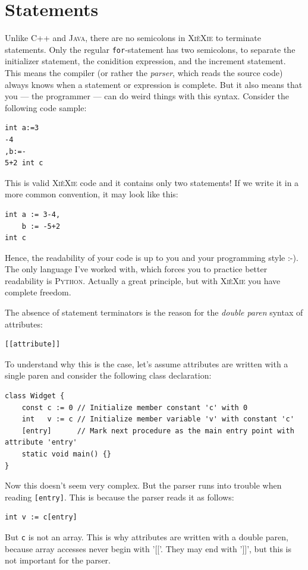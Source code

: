 \documentclass{report}
\def\xiexie{\textsc{Xi\`eXie}\xspace}
\def\cpp{\textsc{C++}\xspace}
\def\java{\textsc{Java}\xspace}
\def\python{\textsc{Python}\xspace}
\begin{document}

\section{Statements}

Unlike \cpp and \java, there are no semicolons in \xiexie to terminate statements.
Only the regular \texttt{for}-statement has two semicolons, to separate the initializer statement,
the conidition expression, and the increment statement. This means the compiler
(or rather the \textit{parser}, which reads the source code) always knows when a statement or expression is complete.
But it also means that you --- the programmer --- can do weird things with this syntax. Consider the following code sample:
\begin{lstlisting}
int a:=3
-4
,b:=-
5+2 int c
\end{lstlisting}
This is valid \xiexie code and it contains only two statements!
If we write it in a more common convention, it may look like this:
\begin{lstlisting}
int a := 3-4,
    b := -5+2
int c
\end{lstlisting}
Hence, the readability of your code is up to you and your programming style :-). The only language I've worked with,
which forces you to practice better readability is \python.
Actually a great principle, but with \xiexie you have complete freedom.

The absence of statement terminators is the reason for the \textit{double paren} syntax of attributes:
\begin{lstlisting}
[[attribute]]
\end{lstlisting}
To understand why this is the case, let's assume attributes are written with a single paren and consider
the following class declaration:
\begin{lstlisting}
class Widget {
    const c := 0 // Initialize member constant 'c' with 0
    int   v := c // Initialize member variable 'v' with constant 'c'
    [entry]      // Mark next procedure as the main entry point with attribute 'entry'
    static void main() {}
}
\end{lstlisting}
Now this doesn't seem very complex. But the parser runs into trouble when reading \texttt{[entry]}.
This is because the parser reads it as follows:
\begin{lstlisting}
int v := c[entry]
\end{lstlisting}
But \texttt{c} is not an array. This is why attributes are written with a double paren, because array accesses
never begin with '[['. They may end with ']]', but this is not important for the parser.
\end{document}
